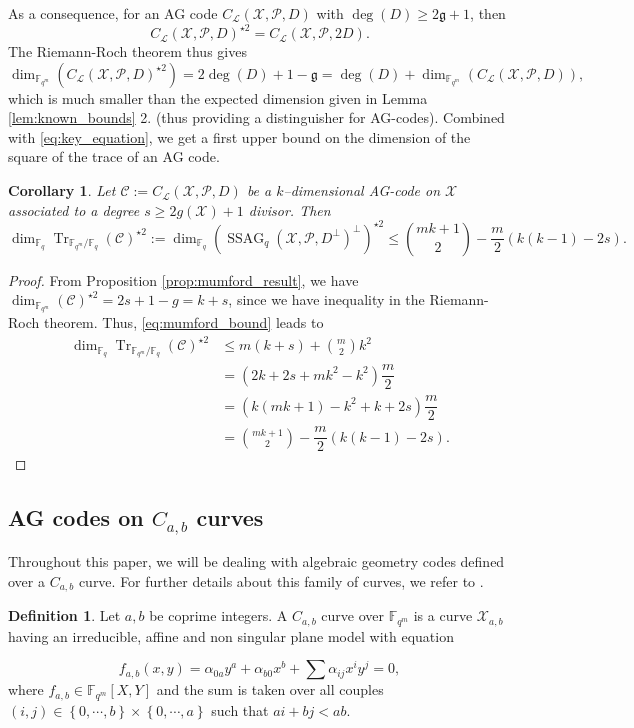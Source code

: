 \documentclass[a4paper]{article}
\newtheorem{coro}[thm]{Corollary}
\theoremstyle{definition}
\newtheorem{definition}[thm]{Definition}
\theoremstyle{remark}
\newcommand{\calP}{\mathcal{P}}
\newcommand{\calL}{\mathcal{L}}
\newcommand{\calC}{\mathcal{C}}
\newcommand{\calX}{\mathcal{X}}
\newcommand{\fqm}{\mathbb{F}_{q^m}}
\newcommand{\fq}{\mathbb{F}_{q}}
\newcommand{\Tr}[1]{\operatorname{Tr}_{\mathbb{F}_{q^m}/\fq}\left(#1\right)}
\newcommand{\set}[1]{\left\{#1\right\}}
\newcommand{\ssag}[1]{\operatorname{SSAG}_{q}\left(#1\right)}
\begin{document}
\noindent As a consequence, for an AG code  $C_{\calL}(\calX,\mathcal{P},D)$ with $\deg(D) \geq 2\mathfrak{g}+1$, then 
\[ C_{\calL}(\calX,\mathcal{P},D)^{\star2} = C_{\calL}(\calX,\calP,2D).\]
The Riemann-Roch theorem thus gives
\[ \dim_{\fqm}(C_{\calL}(\calX,\mathcal{P},D)^{\star2}) = 2\deg(D)+1-\mathfrak{g}= \deg(D) + \dim_{\fqm}(C_{\calL}(\calX,\mathcal{P},D)), \]
which is much smaller than the expected dimension given in Lemma \ref{lem:known_bounds} 2. (thus providing a distinguisher for AG-codes). Combined with \eqref{eq:key_equation}, we get a first upper bound on the dimension of the square of the trace of an AG code.


\begin{coro} \label{coro:1st_bound_mumford}
	Let $\mathcal{C} := C_{\calL}(\calX,\mathcal{P},D)$ be a $k$--dimensional AG-code on $\calX$ associated to a degree $s \geq 2g(\calX)+1$ divisor. Then
	\[ \dim_{\fq}\Tr{\calC}^{\star2} := \dim_{\fq} (\ssag{\calX,\calP,D^{\perp}}^{\perp})^{\star2}  \leq \binom{mk+1}{2} - \dfrac{m}{2} (k(k-1)-2s).\]
\end{coro}


\begin{proof}
	From Proposition \ref{prop:mumford_result}, we have $\dim_{\fqm}(\calC)^{\star2} = 2s+1-g = k+s$, since we have inequality in the Riemann-Roch theorem. Thus, \eqref{eq:mumford_bound} leads to
	\begin{align*}
		\dim_{\fq}\Tr{\calC}^{\star2} &\leq m(k+s) + \binom{m}{2}k^2 \\
		&= (2k+2s+mk^2-k^2) \dfrac{m}{2} \\
		&= (k(mk+1)-k^2+k+2s) \dfrac{m}{2} \\
		&= \binom{mk+1}{2} - \dfrac{m}{2}(k(k-1)-2s) .
	\end{align*}
\end{proof}







\subsection{AG codes on $C_{a,b}$ curves} \label{section:C_a,b_codes}

Throughout this paper, we will be dealing with algebraic geometry codes defined over a $C_{a,b}$ curve. For further details about this family of curves, we refer to \cite{Miu93}. 



\begin{definition} \label{def:C_ab_curves} 
Let $a,b$ be coprime integers. A $C_{a,b}$ curve over $\fqm$ is a curve $\calX_{a,b}$ having an irreducible, affine and non singular plane model with equation

\begin{equation} \label{eq:equation_C_ab}
f_{a,b}(x,y) = \alpha_{0a}y^a + \alpha_{b0}x^b + \sum \alpha_{ij}x^iy^j = 0,
\end{equation}
where $f_{a,b} \in \fqm[X,Y]$ and the sum is taken over all couples $(i,j) \in \set{0,\cdots,b} \times \set{0,\cdots,a}$ such that $ai+bj < ab$.
\end{definition}
\end{document}
